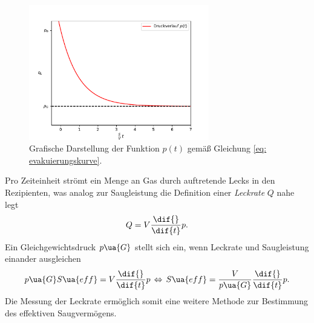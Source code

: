\begin{figure}[h]
  \centering
  \includegraphics[width = 0.7\textwidth]{theorie_plots/theo_p.pdf}
  \caption{Grafische Darstellung der Funktion $p(t)$ gemäß Gleichung \eqref{eq: evakuierungskurve}.}
  \label{fig: theo_p_t}
\end{figure}
\FloatBarrier
Pro Zeiteinheit
strömt ein Menge an Gas durch auftretende Lecks in den Rezipienten, was analog zur Saugleistung
die Definition einer \emph{Leckrate} $Q$ nahe legt
\begin{equation}
  Q = V \frac{\dif{}}{\dif{t}} p.
\end{equation}
Ein Gleichgewichtsdruck $p\ua{G}$ stellt sich ein, wenn Leckrate und Saugleistung einander ausgleichen
\begin{equation}
  p\ua{G} S\ua{eff} =  V \frac{\dif{}}{\dif{t}} p \, \Leftrightarrow \,
  S\ua{eff} =  \frac{V}{p\ua{G}} \frac{\dif{}}{\dif{t}} p.
  \label{eq: saugvermögen_leckrate}
\end{equation}
Die Messung der Leckrate ermöglich somit eine weitere Methode zur Bestimmung des effektiven Saugvermögens.
